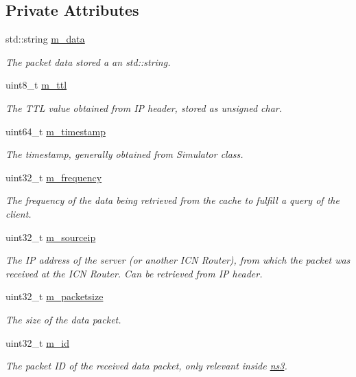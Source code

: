 \subsection*{Private Attributes}
\begin{DoxyCompactItemize}
\item 
std\-::string \hyperlink{classns3_1_1NamedContentCacheEntry_a4cd486a2576f324c55e98a0af5bd97dc}{m\-\_\-data}
\begin{DoxyCompactList}\small\item\em The packet data stored a an std\-::string. \end{DoxyCompactList}\item 
uint8\-\_\-t \hyperlink{classns3_1_1NamedContentCacheEntry_a32091010cd1ac42594343b6e70a9ed4b}{m\-\_\-ttl}
\begin{DoxyCompactList}\small\item\em The T\-T\-L value obtained from I\-P header, stored as unsigned char. \end{DoxyCompactList}\item 
uint64\-\_\-t \hyperlink{classns3_1_1NamedContentCacheEntry_a39bcfa21f1215510a93ea3dbf7ff40b0}{m\-\_\-timestamp}
\begin{DoxyCompactList}\small\item\em The timestamp, generally obtained from Simulator class. \end{DoxyCompactList}\item 
uint32\-\_\-t \hyperlink{classns3_1_1NamedContentCacheEntry_a40892bae510bf08afedf818012291802}{m\-\_\-frequency}
\begin{DoxyCompactList}\small\item\em The frequency of the data being retrieved from the cache to fulfill a query of the client. \end{DoxyCompactList}\item 
uint32\-\_\-t \hyperlink{classns3_1_1NamedContentCacheEntry_a9ec65f4809ae05fd4efacdd2adca90a1}{m\-\_\-sourceip}
\begin{DoxyCompactList}\small\item\em The I\-P address of the server (or another I\-C\-N Router), from which the packet was received at the I\-C\-N Router. Can be retrieved from I\-P header. \end{DoxyCompactList}\item 
uint32\-\_\-t \hyperlink{classns3_1_1NamedContentCacheEntry_aa7848090a3ba7346183ddad2b4630717}{m\-\_\-packetsize}
\begin{DoxyCompactList}\small\item\em The size of the data packet. \end{DoxyCompactList}\item 
uint32\-\_\-t \hyperlink{classns3_1_1NamedContentCacheEntry_a9fa45d5bfcc9a43f72beae36ce5fdba4}{m\-\_\-id}
\begin{DoxyCompactList}\small\item\em The packet I\-D of the received data packet, only relevant inside \hyperlink{namespacens3}{ns3}. \end{DoxyCompactList}\end{DoxyCompactItemize}



